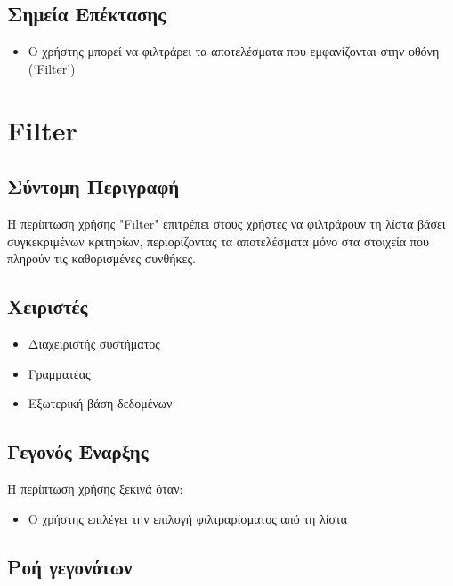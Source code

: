 \documentclass[12pt,a4paper,twoside]{book}
\begin{document}
\subsection{Σημεία Επέκτασης}
\begin{itemize}
  \item Ο χρήστης μπορεί να φιλτράρει τα αποτελέσματα που εμφανίζονται στην οθόνη (`Filter') %
\end{itemize}

\section{Filter}

\subsection{Σύντομη Περιγραφή}
Η περίπτωση χρήσης "Filter" επιτρέπει στους χρήστες να φιλτράρουν τη λίστα βάσει συγκεκριμένων κριτηρίων, περιορίζοντας τα αποτελέσματα μόνο στα στοιχεία που πληρούν τις καθορισμένες συνθήκες. %

\subsection{Χειριστές}
\begin{itemize}
  \item Διαχειριστής συστήματος
  \item Γραμματέας
  \item Εξωτερική βάση δεδομένων %
\end{itemize}

\subsection{Γεγονός Έναρξης}
Η περίπτωση χρήσης ξεκινά όταν:
\begin{itemize}
  \item Ο χρήστης επιλέγει την επιλογή φιλτραρίσματος από τη λίστα %
\end{itemize}

\subsection{Ροή γεγονότων}
\end{document}
